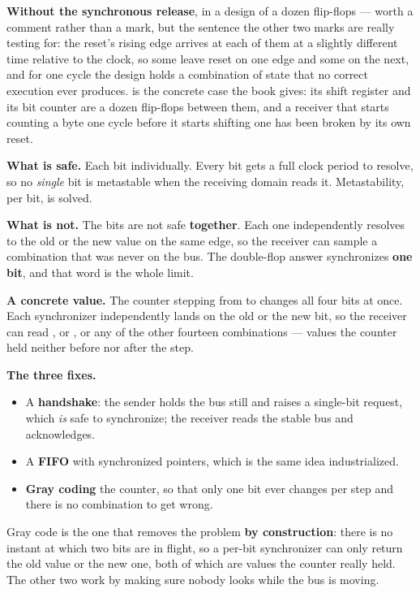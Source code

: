 \textbf{Without the synchronous release}, in a design of a dozen flip-flops --- worth a comment
rather than a mark, but the sentence the other two marks are really testing for: the reset's rising
edge arrives at each of them at a slightly different time relative to the clock, so some leave reset
on one edge and some on the next, and for one cycle the design holds a combination of state that no
correct execution ever produces.  is the concrete case the book gives: its shift
register and its bit counter are a dozen flip-flops between them, and a receiver that starts
counting a byte one cycle before it starts shifting one has been broken by its own reset.

\textbf{What is safe.} Each bit individually. Every bit gets a full clock period to resolve, so no
\emph{single} bit is metastable when the receiving domain reads it. Metastability, per bit, is
solved.

\textbf{What is not.} The bits are not safe \textbf{together}. Each one independently resolves to
the old or the new value on the same edge, so the receiver can sample a combination that was never
on the bus. The double-flop answer synchronizes \textbf{one bit}, and that word is the whole limit.

\textbf{A concrete value.} The counter stepping from  to  changes all four
bits at once. Each synchronizer independently lands on the old or the new bit, so the receiver can
read , or , or any of the other fourteen combinations --- values the counter
held neither before nor after the step. 

\textbf{The three fixes.}
\begin{itemize}
  \item A \textbf{handshake}: the sender holds the bus still and raises a single-bit request, which
    \emph{is} safe to synchronize; the receiver reads the stable bus and acknowledges.
  \item A \textbf{FIFO} with synchronized pointers, which is the same idea industrialized.
  \item \textbf{Gray coding} the counter, so that only one bit ever changes per step and there is
    no combination to get wrong.
\end{itemize}
Gray code is the one that removes the problem \textbf{by construction}: there is no instant at which
two bits are in flight, so a per-bit synchronizer can only return the old value or the new one,
both of which are values the counter really held. The other two work by making sure nobody looks
while the bus is moving. 

